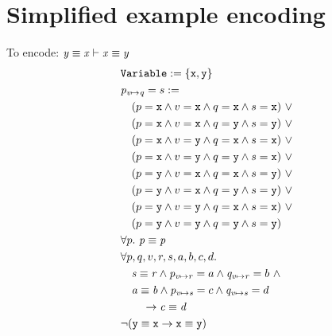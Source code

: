 \documentclass[a4paper]{article}
\begin{document}
\section{Simplified example encoding}
To encode: $\mathit{y} \equiv \mathit{x} \vdash \mathit{x} \equiv \mathit{y}$
\begin{align}
  &\texttt{\ensuremath{\mathtt{Variable}}} := \{\mathtt{x}, \mathtt{y}\}\\
  &\mathit{p}_{\mathit{v} \mapsto \mathit{q}} = s :=\\
  &\quad (p=\mathtt{x} \land v=\mathtt{x} \land q=\mathtt{x} \land s=\mathtt{x})~\lor\\
  &\quad (p=\mathtt{x} \land v=\mathtt{x} \land q=\mathtt{y} \land s=\mathtt{y})~\lor\\
  &\quad (p=\mathtt{x} \land v=\mathtt{y} \land q=\mathtt{x} \land s=\mathtt{x})~\lor\\
  &\quad (p=\mathtt{x} \land v=\mathtt{y} \land q=\mathtt{y} \land s=\mathtt{x})~\lor\\
  &\quad (p=\mathtt{y} \land v=\mathtt{x} \land q=\mathtt{x} \land s=\mathtt{y})~\lor\\
  &\quad (p=\mathtt{y} \land v=\mathtt{x} \land q=\mathtt{y} \land s=\mathtt{y})~\lor\\
  &\quad (p=\mathtt{y} \land v=\mathtt{y} \land q=\mathtt{x} \land s=\mathtt{x})~\lor\\
  &\quad (p=\mathtt{y} \land v=\mathtt{y} \land q=\mathtt{y} \land s=\mathtt{y})\\
  &\forall p.~\mathit{p} \equiv \mathit{p}\\
  &\forall p, q, v, r, s, a, b, c, d.\\
  &\quad \mathit{s} \equiv \mathit{r} \land \mathit{p}_{\mathit{v} \mapsto \mathit{r}}=a \land \mathit{q}_{\mathit{v} \mapsto \mathit{r}}=b~\land\\
  &\quad \mathit{a} \equiv \mathit{b} \land
         \mathit{p}_{\mathit{v} \mapsto \mathit{s}}=c \land \mathit{q}_{\mathit{v} \mapsto \mathit{s}}=d\\
  &\qquad \rightarrow \mathit{c} \equiv \mathit{d}\\
  &\neg (\mathit{\mathtt{y}} \equiv \mathit{\mathtt{x}} \rightarrow \mathit{\mathtt{x}} \equiv \mathit{\mathtt{y}})
\end{align}
\newpage
\end{document}
